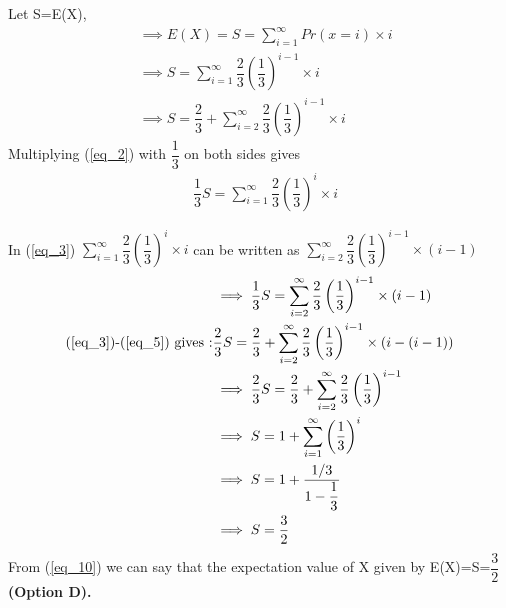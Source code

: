 \documentclass[a4paper]{article}
\begin{document}
\begin{multicols*}{2}
Let S=E(X),
\begin{align}
&\implies E(X)=S=\sum_{i=1}^{\infty} Pr(x=i)\times i\\
&\implies S=\sum_{i=1}^{\infty} \dfrac{2}{3}\left(\dfrac{1}{3}\right)^{i-1} \times i \label{eq_2}   \\
&\implies S=\dfrac{2}{3}+\sum_{i=2}^{\infty} \dfrac{2}{3}\left(\dfrac{1}{3}\right)^{i-1} \times i  \label{eq_3}
\end{align}
Multiplying (\ref{eq_2}) with  $\dfrac{1}{3}$ on both sides gives
\begin{align}
&\dfrac{1}{3}S=\sum_{i=1}^{\infty} \dfrac{2}{3}\left(\dfrac{1}{3}\right)^{i} \times i \label{eq_4}
\end{align}

In (\ref{eq_3})	$\sum_{i=1}^{\infty} \dfrac{2}{3}\left(\dfrac{1}{3}\right)^{i} \times i$ can be written as $\sum_{i=2}^{\infty} \dfrac{2}{3}\left(\dfrac{1}{3}\right)^{i-1} \times (i-1)$
\begin{align}
& \implies \dfrac{1}{3}S=\sum_{i=2}^{\infty} \dfrac{2}{3}\left(\dfrac{1}{3}\right)^{i-1} \times (i-1) \label{eq_5} \\
\text{(\ref{eq_3})-(\ref{eq_5}) gives :}& \dfrac{2}{3}S=\dfrac{2}{3}+\sum_{i=2}^{\infty} \dfrac{2}{3}\left(\dfrac{1}{3}\right)^{i-1} \times (i-(i-1))\\
&\implies  \dfrac{2}{3}S=\dfrac{2}{3}+\sum_{i=2}^{\infty} \dfrac{2}{3}\left(\dfrac{1}{3}\right)^{i-1}\\
& \implies S=1+\sum_{i=1}^{\infty}\left(\dfrac{1}{3}\right)^{i}\\
& \implies S=1+\dfrac{1/3}{1-\dfrac{1}{3}}\\
& \implies S=\dfrac{3}{2} \label{eq_10}
\end{align}
From (\ref{eq_10}) we can say that the expectation value of X given by E(X)=S=$\dfrac{3}{2}$		
\textbf{(Option D).}


\end{multicols*}
\end{document}
